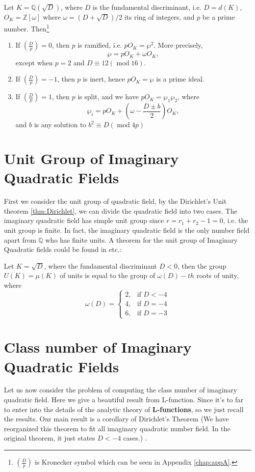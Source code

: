 \begin{theorem}\label{thm:quad_decompose}
Let $K=\mathbb{Q}(\sqrt{D})$, where $D$ is the fundamental discriminant, i.e. $D=d(K)$, $O_K=\mathbb{Z}[\omega]$ where $\omega=(D+\sqrt{D})/2$ its ring of integers, and $p$ be a prime number. Then\footnote{$\left(\frac{D}{p}\right)$ is Kronecker symbol which can be seen in Appendix \ref{chap:appA}.}
\begin{enumerate}
\item If $\left(\frac{D}{p}\right)=0$, then $p$ is ramified, i.e. $pO_K=\wp^2$. More precisely, $$\wp=pO_K+\omega O_K,$$ except when $p=2$ and $D\equiv12(\operatorname{mod} 16)$.
\item If $\left(\frac{D}{p}\right)=-1$, then $p$ is inert, hence $pO_K=\wp$ is a prime ideal.
\item If $\left(\frac{D}{p}\right)=1$, then $p$ is split, and we have $pO_K=\wp_1\wp_2$, where 
$$\wp_i=pO_K+(\omega-\frac{D\pm b}{2})O_K,$$ and $b$ is any solution to $b^2\equiv D(\operatorname{mod} 4p)$
\end{enumerate}
\end{theorem}

\section{Unit Group of Imaginary Quadratic Fields}
First we consider the unit group of quadratic field, by the Dirichlet's Unit theorem \ref{thm:Dirichlet}, we can divide the quadratic field into two cases. The imaginary quadratic field has simple unit group since $r=r_1+r_2-1=0$, i.e. the unit group is finite. In fact, the imaginary quadratic field is the only number field apart from $\mathbb{Q}$ who has finite units. A theorem for the unit group of Imaginary Quadratic fields could be found in \citep{Xianke2006ANT,cohen1993course} etc.:

\begin{theorem}\label{thm:quad_unit}
Let $K=\sqrt{D}$, where the fundamental discriminant $D<0$, then the group $U(K)=\mu(K)$ of units  is equal to the group of $\omega(D)-th$ roots of unity, where 
$$\omega(D)=\left\{\begin{array}{ll}
2,& \text{if }D<-4\\
4,& \text{if }D=-4\\
6,& \text{if }D=-3
\end{array}\right.$$
\end{theorem}

\section{Class number of Imaginary Quadratic Fields}
Let us now consider the problem of computing the class number of imaginary quadratic field. Here we give a beautiful result from L-function. Since it's to far to enter into the details of the analytic theory of \textbf{L-functions}, so we just recall the results. Our main result is a corollary of Dirichlet's Theorem (We have reorganized this theorem to fit all imaginary quadratic number field. In the original theorem, it just states $D<-4$ cases.) \citep{cohen1993course}.
 
